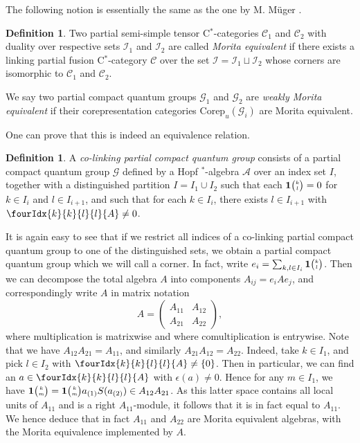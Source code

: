 \documentclass[10pt]{article}
\newcommand{\Corep}{\mathrm{Corep}}
\newcommand{\CatCC}{\mathscr{C}}
\newcommand{\Grt}[3]{#1{\tiny {\begin{pmatrix} #2\\#3\end{pmatrix}}}}
\newcommand{\UnitC}[2]{\Grt{\mathbf{1}}{#1}{#2}}
\newcommand{\Gr}[5]{\fourIdx{#2}{#4}{#3}{#5}{#1}}%
\theoremstyle{definition}
\newtheorem{Def}[Theorem]{Definition}
\numberwithin{equation}{section}
\begin{document}
The following notion is essentially the same as the one by M. M\"{u}ger \cite{Mug1}. 

\begin{Def} Two partial semi-simple tensor C$^*$-categories $\CatCC_1$ and $\CatCC_2$ with duality over respective sets $\mathscr{I}_1$ and $\mathscr{I}_2$ are called \emph{Morita equivalent} if there exists a linking partial fusion C$^*$-category $\CatCC$ over the set $\mathscr{I}=\mathscr{I}_1\sqcup \mathscr{I}_2$ whose corners are isomorphic to $\CatCC_1$ and $\CatCC_2$.

We say two partial compact quantum groups $\mathscr{G}_1$ and $\mathscr{G}_2$ are \emph{weakly Morita equivalent} if their corepresentation categories $\Corep_u(\mathscr{G}_i)$ are Morita equivalent. 
\end{Def} 

One can prove that this is indeed an equivalence relation. %

\begin{Def}\label{DefCoLink} A \emph{co-linking partial compact quantum group} consists of a partial compact quantum group $\mathscr{G}$ defined by a Hopf $^*$-algebra $\mathscr{A}$ over an index set $I$, together with a distinguished partition $I = I_1\cup I_2$ such that each $\UnitC{k}{l}=0$ for $k\in I_i$ and $l\in I_{i+1}$, and such that for each $k\in I_i$, there exists $l\in I_{i+1}$ with $\Gr{A}{k}{l}{k}{l}\neq 0$.  
\end{Def} 

It is again easy to see that if we restrict all indices of a co-linking partial compact quantum group to one of the distinguished sets, we obtain a partial compact quantum group which we will call a corner. In fact, write $e_i = \sum_{k,l\in I_i} \UnitC{k}{l}$. Then we can decompose the total algebra $A$ into components $A_{ij} = e_{i}Ae_{j}$, and correspondingly write $A$ in matrix notation \[ A = \begin{pmatrix} A_{11} & A_{12}  \\ A_{21} & A_{22}\end{pmatrix},\] where multiplication is matrixwise and where comultiplication is entrywise. Note that we have $A_{12}A_{21} = A_{11}$, and similarly $A_{21}A_{12} = A_{22}$. Indeed, take $k\in I_1$, and pick $l\in I_2$ with $\Gr{A}{k}{l}{k}{l}\neq \{0\}$. Then in particular, we can find an $a\in \Gr{A}{k}{l}{k}{l}$ with $\epsilon(a)\neq 0$. Hence for any $m\in I_1$, we have $\UnitC{k}{m} = \UnitC{k}{m} a_{(1)}S(a_{(2)}) \in A_{12}A_{21}$. As this latter space contains all local units of $A_{11}$ and is a right $A_{11}$-module, it follows that it is in fact equal to $A_{11}$. We hence deduce that in fact $A_{11}$ and $A_{22}$ are Morita equivalent algebras, with the Morita equivalence implemented by $A$. %
\end{document}
